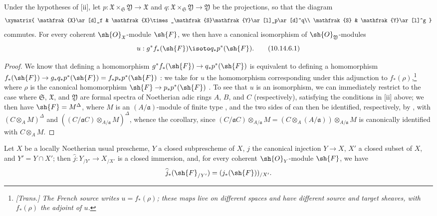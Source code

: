 \begin{corollary}[10.14.6]
\label{I.10.14.6}
Under the hypotheses of [ii], let $p:\mathfrak{X}\times_\mathfrak{S}\mathfrak{Y}\to\mathfrak{X}$ and $q:\mathfrak{X}\times_\mathfrak{S}\mathfrak{Y}\to\mathfrak{Y}$ be the projections, so that the diagram
\[
  \xymatrix{
    \mathfrak{X}\ar[d]_f &
    \mathfrak{X}\times_\mathfrak{S}\mathfrak{Y}\ar[l]_p\ar[d]^q\\
    \mathfrak{S} &
    \mathfrak{Y}\ar[l]^g
  }
\]
commutes.
For every coherent $\sh{O}_\mathfrak{X}$-module $\sh{F}$, we then have a canonical isomorphism of $\sh{O}_\mathfrak{Y}$-modules
\[
\label{I.10.14.6.1}
  u:g^*f_*(\sh{F})\isoto q_*p^*(\sh{F}).
  \tag{10.14.6.1}
\]
\end{corollary}

\begin{proof}
We know that defining a homomorphism $g^*f_*(\sh{F}) \to q_*p^*(\sh{F})$ is equivalent to defining a homomorphism $f_*(\sh{F}) \to g_*q_*p^*(\sh{F}) = f_*p_*p^*(\sh{F})$ :
we take for $u$ the homomorphism corresponding under this adjunction to $f_*(\rho)$,\footnote{\emph{[Trans.] The French source writes $u=f_*(\rho)$; these maps live on different spaces and have different source and target sheaves, with $f_*(\rho)$ the adjoint of $u$.}} where $\rho$ is the canonical homomorphism $\sh{F}\to p_*p^*(\sh{F})$ .
To see that $u$ is an isomorphism, we can immediately restrict to the case where $\mathfrak{S}$, $\mathfrak{X}$, and $\mathfrak{Y}$ are formal spectra of Noetherian adic rings $A$, $B$, and $C$ (respectively), satisfying the conditions in [ii] above;
we then have $\sh{F}=M^\Delta$, where $M$ is an $(A/\mathfrak{a})$-module of finite type , and the two sides of  can then be identified, respectively, by , with $(C\otimes_A M)^\Delta$ and $((C/\mathfrak{a}C)\otimes_{A/\mathfrak{a}}M)^\Delta$, whence the corollary, since $(C/\mathfrak{a}C)\otimes_{A/\mathfrak{a}}M = (C\otimes_A(A/\mathfrak{a}))\otimes_{A/\mathfrak{a}}M$ is canonically identified with $C\otimes_A M$.
\end{proof}

\begin{corollary}[10.14.7]
\label{I.10.14.7}
Let $X$ be a locally Noetherian usual prescheme, $Y$ a closed subprescheme of $X$, $j$ the canonical injection $Y\to X$, $X'$ a closed subset of $X$, and $Y'=Y\cap X'$;
then $\widehat{j}:Y_{/Y'}\to X_{/X'}$ is a closed immersion, and, for every coherent $\sh{O}_Y$-module $\sh{F}$, we have
\[
    \widehat{j}_*(\sh{F}_{/Y'}) = (j_*(\sh{F}))_{/X'}.
\]
\end{corollary}

